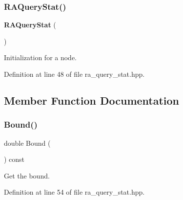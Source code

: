 \mbox{\label{classmlpack_1_1neighbor_1_1RAQueryStat_a8c97f34a41094a4e0ce70487fa0f161b}} 
\subsubsection{R\+A\+Query\+Stat()\hspace{0.1cm}{\footnotesize\ttfamily [2/2]}}
{\footnotesize\ttfamily \textbf{ R\+A\+Query\+Stat} (\begin{DoxyParamCaption}\item[{const Tree\+Type \&}]{ }\end{DoxyParamCaption})\hspace{0.3cm}{\ttfamily [inline]}}



Initialization for a node. 



Definition at line 48 of file ra\+\_\+query\+\_\+stat.\+hpp.



\subsection{Member Function Documentation}
\mbox{\label{classmlpack_1_1neighbor_1_1RAQueryStat_abe1eb75f967ca19571a77a1e90faa0ad}} 
\subsubsection{Bound()\hspace{0.1cm}{\footnotesize\ttfamily [1/2]}}
{\footnotesize\ttfamily double Bound (\begin{DoxyParamCaption}{ }\end{DoxyParamCaption}) const\hspace{0.3cm}{\ttfamily [inline]}}



Get the bound. 



Definition at line 54 of file ra\+\_\+query\+\_\+stat.\+hpp.

